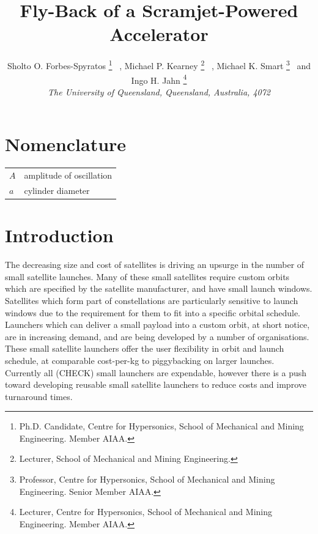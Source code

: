 \documentclass[conf]{new-aiaa}
\title{Fly-Back of a Scramjet-Powered Accelerator}
\author{
 	Sholto O. Forbes-Spyratos%
 	\footnote{Ph.D. Candidate, Centre for Hypersonics, School of Mechanical and Mining Engineering. Member AIAA.}
 	\ ,  Michael P. Kearney
 	\footnote{Lecturer, School of Mechanical and Mining Engineering.}
 	\ ,  Michael K. Smart
 	\footnote{Professor, Centre for Hypersonics, School of Mechanical and Mining Engineering. Senior Member AIAA.}
 	\ and   Ingo H. Jahn
 	\footnote{Lecturer, Centre for Hypersonics, School of Mechanical and Mining Engineering. Member AIAA.}
 	\\
 	{\normalsize\itshape
 		The University of Queensland, Queensland, Australia, 4072}\\
 }
\begin{document}
\maketitle

\begin{abstract}

\end{abstract}

\section{Nomenclature}

{\renewcommand\arraystretch{1.0}
\noindent\begin{longtable*}{@{}l @{\quad=\quad} l@{}}
$A$  & amplitude of oscillation \\
$a$ &    cylinder diameter \\

\end{longtable*}}

\section{Introduction}

The decreasing size and cost of satellites is driving an upsurge in the number of small satellite launches\cite{Faa&Ast&Comstac2015}. Many of these small satellites require custom orbits which are specified by the satellite manufacturer, and have small launch windows. Satellites which form part of constellations are particularly sensitive to launch windows due to the requirement for them to fit into a specific orbital schedule\cite{Crisp2015}. Launchers which can deliver a small payload into a custom orbit, at short notice, are in increasing demand, and are being developed by a number of organisations. These small satellite launchers offer the user flexibility in orbit and launch schedule, at comparable cost-per-kg to piggybacking on larger launches. Currently all (CHECK) small launchers are expendable, however there is a push toward developing reusable small satellite launchers to reduce costs and improve turnaround times.
\end{document}
